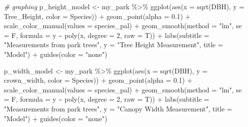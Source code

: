 \documentclass[12pt,twoside]{reedthesis}
\newenvironment{Shaded}{\begin{snugshade}}{\end{snugshade}}
\newcommand{\AttributeTok}[1]{\textcolor[rgb]{0.77,0.63,0.00}{#1}}
\newcommand{\CommentTok}[1]{\textcolor[rgb]{0.56,0.35,0.01}{\textit{#1}}}
\newcommand{\DecValTok}[1]{\textcolor[rgb]{0.00,0.00,0.81}{#1}}
\newcommand{\FloatTok}[1]{\textcolor[rgb]{0.00,0.00,0.81}{#1}}
\newcommand{\FunctionTok}[1]{\textcolor[rgb]{0.00,0.00,0.00}{#1}}
\newcommand{\NormalTok}[1]{#1}
\newcommand{\OtherTok}[1]{\textcolor[rgb]{0.56,0.35,0.01}{#1}}
\newcommand{\SpecialCharTok}[1]{\textcolor[rgb]{0.00,0.00,0.00}{#1}}
\newcommand{\StringTok}[1]{\textcolor[rgb]{0.31,0.60,0.02}{#1}}
\begin{document}
\begin{Shaded}
\begin{Highlighting}[]
\CommentTok{\# graphing}
\NormalTok{p\_height\_model }\OtherTok{\textless{}{-}}\NormalTok{ my\_park }\SpecialCharTok{\%\textgreater{}\%}
    \FunctionTok{ggplot}\NormalTok{(}\FunctionTok{aes}\NormalTok{(}\AttributeTok{x =} \FunctionTok{sqrt}\NormalTok{(DBH), }\AttributeTok{y =}\NormalTok{ Tree\_Height, }\AttributeTok{color =}\NormalTok{ Species)) }\SpecialCharTok{+}
    \FunctionTok{geom\_point}\NormalTok{(}\AttributeTok{alpha =} \FloatTok{0.1}\NormalTok{) }\SpecialCharTok{+} \FunctionTok{scale\_color\_manual}\NormalTok{(}\AttributeTok{values =}\NormalTok{ species\_pal) }\SpecialCharTok{+}
    \FunctionTok{geom\_smooth}\NormalTok{(}\AttributeTok{method =} \StringTok{"lm"}\NormalTok{, }\AttributeTok{se =}\NormalTok{ F, }\AttributeTok{formula =}\NormalTok{ y }\SpecialCharTok{\textasciitilde{}} \FunctionTok{poly}\NormalTok{(x,}
        \AttributeTok{degree =} \DecValTok{2}\NormalTok{, }\AttributeTok{raw =}\NormalTok{ T)) }\SpecialCharTok{+} \FunctionTok{labs}\NormalTok{(}\AttributeTok{subtitle =} \StringTok{"Measurements from park trees"}\NormalTok{,}
    \AttributeTok{y =} \StringTok{"Tree Height Measurement"}\NormalTok{, }\AttributeTok{title =} \StringTok{"Model"}\NormalTok{) }\SpecialCharTok{+} \FunctionTok{guides}\NormalTok{(}\AttributeTok{color =} \StringTok{"none"}\NormalTok{)}

\NormalTok{p\_width\_model }\OtherTok{\textless{}{-}}\NormalTok{ my\_park }\SpecialCharTok{\%\textgreater{}\%}
    \FunctionTok{ggplot}\NormalTok{(}\FunctionTok{aes}\NormalTok{(}\AttributeTok{x =} \FunctionTok{sqrt}\NormalTok{(DBH), }\AttributeTok{y =}\NormalTok{ crown\_width, }\AttributeTok{color =}\NormalTok{ Species)) }\SpecialCharTok{+}
    \FunctionTok{geom\_point}\NormalTok{(}\AttributeTok{alpha =} \FloatTok{0.1}\NormalTok{) }\SpecialCharTok{+} \FunctionTok{scale\_color\_manual}\NormalTok{(}\AttributeTok{values =}\NormalTok{ species\_pal) }\SpecialCharTok{+}
    \FunctionTok{geom\_smooth}\NormalTok{(}\AttributeTok{method =} \StringTok{"lm"}\NormalTok{, }\AttributeTok{se =}\NormalTok{ F, }\AttributeTok{formula =}\NormalTok{ y }\SpecialCharTok{\textasciitilde{}} \FunctionTok{poly}\NormalTok{(x,}
        \AttributeTok{degree =} \DecValTok{2}\NormalTok{, }\AttributeTok{raw =}\NormalTok{ T)) }\SpecialCharTok{+} \FunctionTok{labs}\NormalTok{(}\AttributeTok{subtitle =} \StringTok{"Measurements from park trees"}\NormalTok{,}
    \AttributeTok{y =} \StringTok{"Canopy Width Measurement"}\NormalTok{, }\AttributeTok{title =} \StringTok{"Model"}\NormalTok{) }\SpecialCharTok{+} \FunctionTok{guides}\NormalTok{(}\AttributeTok{color =} \StringTok{"none"}\NormalTok{)}


\end{Highlighting}
\end{Shaded}
\end{document}
